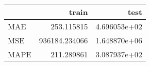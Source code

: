 \begin{tabular}{lrr}
\toprule
{} &          train &          test \\
\midrule
MAE  &     253.115815 &  4.696053e+02 \\
MSE  &  936184.234066 &  1.648870e+06 \\
MAPE &     211.289861 &  3.087937e+02 \\
\bottomrule
\end{tabular}
